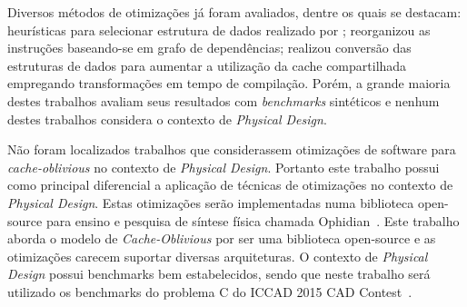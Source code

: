 \begin{table}[hb]
\centering
\caption{Resumo dos trabalhos correlatos.}
\label{tab:resumo_trabalhos_correlatos}
\end{table}

Diversos métodos de otimizações já foram avaliados, dentre os quais se destacam:
heurísticas para selecionar estrutura de dados realizado por ;
 reorganizou as instruções baseando-se em grafo de dependências;
 realizou conversão das estruturas de dados para aumentar a utilização da cache compartilhada empregando transformações em tempo de compilação.
Porém, a grande maioria destes trabalhos avaliam seus resultados com \textit{benchmarks} sintéticos e nenhum destes trabalhos considera o contexto de \textit{Physical Design}.

Não foram localizados trabalhos que considerassem otimizações de software para \textit{cache-oblivious} no contexto de \textit{Physical Design}.
Portanto este trabalho possui como principal diferencial a aplicação de técnicas de otimizações no contexto de \textit{Physical Design}.
Estas otimizações serão implementadas numa biblioteca open-source para ensino e pesquisa de síntese física chamada Ophidian~\cite{ophidian}.
Este trabalho aborda o modelo de \textit{Cache-Oblivious} por ser uma biblioteca open-source e as otimizações carecem suportar diversas arquiteturas.
O contexto de \textit{Physical Design} possui benchmarks bem estabelecidos, sendo que neste trabalho será utilizado os benchmarks do problema C do ICCAD 2015 CAD Contest~\cite{kim2015}.
